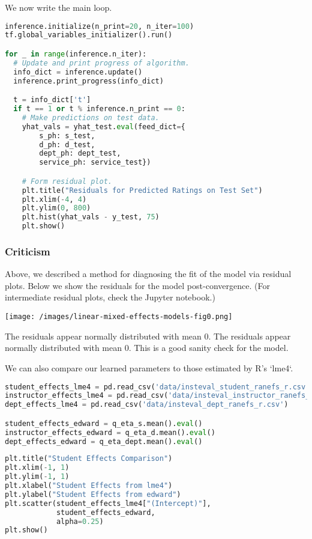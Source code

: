 We now write the main loop.

\begin{lstlisting}[language=Python]
inference.initialize(n_print=20, n_iter=100)
tf.global_variables_initializer().run()

for _ in range(inference.n_iter):
  # Update and print progress of algorithm.
  info_dict = inference.update()
  inference.print_progress(info_dict)

  t = info_dict['t']
  if t == 1 or t % inference.n_print == 0:
    # Make predictions on test data.
    yhat_vals = yhat_test.eval(feed_dict={
        s_ph: s_test,
        d_ph: d_test,
        dept_ph: dept_test,
        service_ph: service_test})

    # Form residual plot.
    plt.title("Residuals for Predicted Ratings on Test Set")
    plt.xlim(-4, 4)
    plt.ylim(0, 800)
    plt.hist(yhat_vals - y_test, 75)
    plt.show()
\end{lstlisting}

\subsubsection{Criticism}

Above, we described a method for diagnosing the fit of the model via
residual plots.
Below we show the residuals for the model post-convergence. (For
intermediate residual plots, check the Jupyter notebook.)

\texttt{[image: /images/linear-mixed-effects-models-fig0.png]}

The residuals appear normally distributed with mean 0. The residuals
appear normally distributed with mean 0. This is a good
sanity check for the model.

We can also compare our learned parameters to those estimated by R's
`lme4`.

\begin{lstlisting}[language=Python]
student_effects_lme4 = pd.read_csv('data/insteval_student_ranefs_r.csv')
instructor_effects_lme4 = pd.read_csv('data/insteval_instructor_ranefs_r.csv')
dept_effects_lme4 = pd.read_csv('data/insteval_dept_ranefs_r.csv')

student_effects_edward = q_eta_s.mean().eval()
instructor_effects_edward = q_eta_d.mean().eval()
dept_effects_edward = q_eta_dept.mean().eval()
\end{lstlisting}

\begin{lstlisting}[language=Python]
plt.title("Student Effects Comparison")
plt.xlim(-1, 1)
plt.ylim(-1, 1)
plt.xlabel("Student Effects from lme4")
plt.ylabel("Student Effects from edward")
plt.scatter(student_effects_lme4["(Intercept)"],
            student_effects_edward,
            alpha=0.25)
plt.show()
\end{lstlisting}

